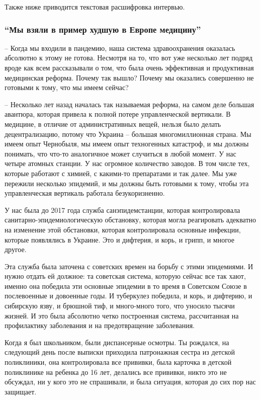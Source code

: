 
Также ниже приводится текстовая расшифровка интервью. 

\subsubsection{\enquote{Мы взяли в пример худшую в Европе медицину}}

– Когда мы входили в пандемию, наша система здравоохранения оказалась абсолютно
к этому не готова. Несмотря на то, что вот уже несколько лет подряд вроде как
всем рассказывали о том, что была очень эффективная и продуктивная медицинская
реформа. Почему так вышло? Почему мы оказались совершенно не готовыми к тому,
что мы имеем сейчас?

– Несколько лет назад началась так называемая реформа, на самом деле большая
авантюра, которая привела к полной потере управленческой вертикали. В медицине,
в отличие от административных вещей, нельзя было делать децентрализацию, потому
что Украина – большая многомиллионная страна. Мы имеем опыт Чернобыля, мы имеем
опыт техногенных катастроф, и мы должны понимать, что что-то аналогичное может
случиться в любой момент. У нас четыре атомных станции. У нас огромное
количество заводов. В том числе тех, которые работают с химией, с какими-то
препаратами и так далее. Мы уже пережили несколько эпидемий, и мы должны быть
готовыми к тому, чтобы эта управленческая вертикаль работала безукоризненно.

У нас была до 2017 года служба санэпидемстанции, которая контролировала
санитарно-эпидемиологическую обстановку, которая могла реагировать адекватно на
изменение этой обстановки, которая контролировала основные инфекции, которые
появлялись в Украине. Это и дифтерия, и корь, и грипп, и многое другое.

Эта служба была заточена с советских времен на борьбу с этими эпидемиями. И
нужно отдать ей должное: та советская система, которую сейчас все так хают,
именно она победила эти основные эпидемии в то время в Советском Союзе в
послевоенные и довоенные годы. И туберкулез победила, и корь, и дифтерию, и
сибирскую язву, и брюшной тиф, и много-много того, что уносило тысячи жизней. И
это была абсолютно четко построенная система, рассчитанная на профилактику
заболевания и на предотвращение заболевания.

Когда я был школьником, были диспансерные осмотры. Ты рождался, на следующий
день после выписки приходила патронажная сестра из детской поликлиники, она
контролировала все прививки, была карточка в детской поликлинике на ребенка до
16 лет, делались все прививки, никто это не обсуждал, ни у кого это не
спрашивали, и была ситуация, которая до сих пор нас защищает.  

